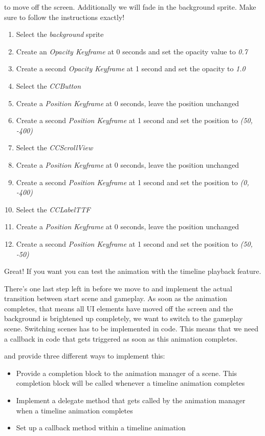 to move off the screen. Additionally we will fade in the background sprite. Make
sure to follow the instructions exactly!
\begin{leftbar}
\begin{enumerate}
  \item Select the \textit{background} sprite
  \item Create an \textit{Opacity Keyframe} at 0 seconds and set the opacity
  value to \textit{0.7}
  \item Create a second \textit{Opacity Keyframe} at 1 second and set the
  opacity to \textit{1.0}
  \item Select the \textit{CCButton}
  \item Create a \textit{Position Keyframe} at 0 seconds, leave the position
  unchanged
  \item Create a second \textit{Position Keyframe} at 1 second and set the
  position to \textit{(50, -400)}
  \item Select the \textit{CCScrollView}
  \item Create a \textit{Position Keyframe} at 0 seconds, leave the position
  unchanged
  \item Create a second \textit{Position Keyframe} at 1 second and set the
  position to \textit{(0, -400)} 
  \item Select the \textit{CCLabelTTF}
  \item Create a \textit{Position Keyframe} at 0 seconds, leave the position
  unchanged
  \item Create a second \textit{Position Keyframe} at 1 second and set the
  position to \textit{(50, -50)}  
\end{enumerate}
\end{leftbar}
Great! If you want you can test the animation with the \SB{} timeline playback
feature.

There's one last step left in \SB{} before we move to \xcode{} and implement the
actual transition between start scene and gameplay. As soon as the animation
completes, that means all UI elements have moved off the screen and the
background is brightened up completely, we want to switch to the gameplay scene.
Switching scenes has to be implemented in code. This means that we need a
callback in code that gets triggered as soon as this animation completes.

\SB{} and \cocos{} provide three different ways to implement this:
\begin{itemize}
  \item Provide a completion block to the animation manager of a scene. This
  completion block will be called whenever a timeline animation completes
  \item Implement a delegate method that gets called by the animation manager
  when a timeline animation completes
  \item Set up a callback method within a \SB{} timeline animation
\end{itemize}

